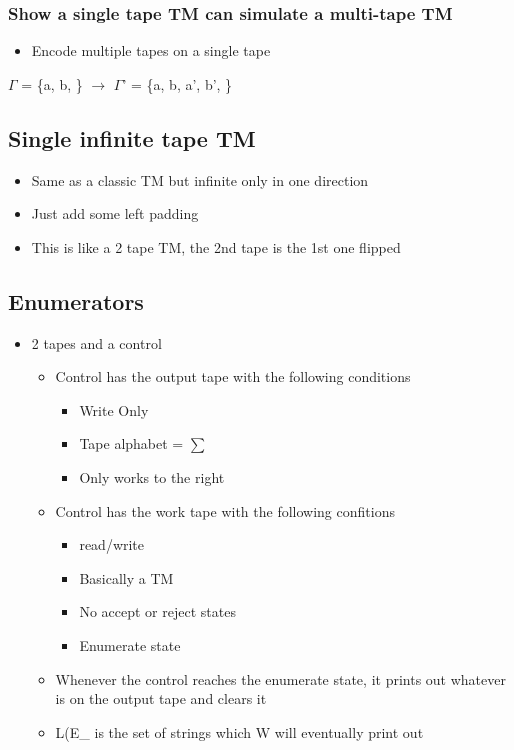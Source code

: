 \documentclass[11pt]{article}
\begin{document}
\subsubsection{Show a single tape TM can simulate a multi-tape TM}
\label{sec:org77ee174}
\begin{itemize}
\item Encode multiple tapes on a single tape
\end{itemize}
\(\Gamma\) = \{a, b, \Box\} \(\rightarrow\) \(\Gamma\)' = \{a, b, a', b', \Box\}
\subsection{Single infinite tape TM}
\label{sec:orga71018a}
\begin{itemize}
\item Same as a classic TM but infinite only in one direction
\item Just add some left padding
\item This is like a 2 tape TM, the 2nd tape is the 1st one flipped
\end{itemize}
\subsection{Enumerators}
\label{sec:org6dfe615}
\begin{itemize}
\item 2 tapes and a control
\begin{itemize}
\item Control has the output tape with the following conditions
\begin{itemize}
\item Write Only
\item Tape alphabet = \(\sum\)
\item Only works to the right
\end{itemize}
\item Control has the work tape with the following confitions
\begin{itemize}
\item read/write
\item Basically a TM
\item No accept or reject states
\item Enumerate state
\end{itemize}
\end{itemize}
\begin{itemize}
\item Whenever the control reaches the enumerate state, it prints out whatever is on the output tape and clears it
\item L(E\_ is the set of strings which W will eventually print out
\end{itemize}
\end{itemize}
\end{document}
